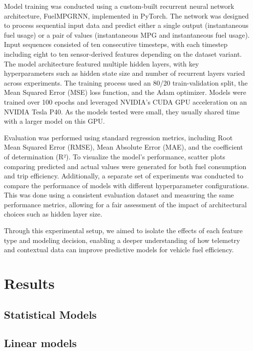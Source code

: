 \documentclass[letterpaper]{article}
\begin{document}
Model training was conducted using a custom-built recurrent neural network 
architecture, FuelMPGRNN, implemented in PyTorch. The network was designed 
to process sequential input data and predict either a single output 
(instantaneous fuel usage) or a pair of values (instantaneous MPG and 
instantaneous fuel usage). Input sequences consisted of ten consecutive 
timesteps, with each timestep including eight to ten sensor-derived 
features depending on the dataset variant. The model architecture featured 
multiple hidden layers, with key hyperparameters such as hidden state size 
and number of recurrent layers varied across experiments. The training 
process used an 80/20 train-validation split, the Mean Squared Error 
(MSE) loss function, and the Adam optimizer. Models were trained over 100 
epochs and leveraged NVIDIA's CUDA GPU acceleration on an NVIDIA Tesla P40. 
As the models tested were small, they usually shared time with a larger 
model on this GPU.

Evaluation was performed using standard regression metrics, including Root 
Mean Squared Error (RMSE), Mean Absolute Error (MAE), and the coefficient 
of determination (R²). To visualize the model's performance, scatter plots 
comparing predicted and actual values were generated for both fuel 
consumption and trip efficiency. Additionally, a separate set of 
experiments was conducted to compare the performance of models with 
different hyperparameter configurations. This was done using a consistent 
evaluation dataset and measuring the same performance metrics, allowing 
for a fair assessment of the impact of architectural choices such as 
hidden layer size.

Through this experimental setup, we aimed to isolate the effects of each 
feature type and modeling decision, enabling a deeper understanding of how 
telemetry and contextual data can improve predictive models for vehicle 
fuel efficiency.

\section*{Results}

\subsection*{Statistical Models}

\subsection{Linear models}
\end{document}

